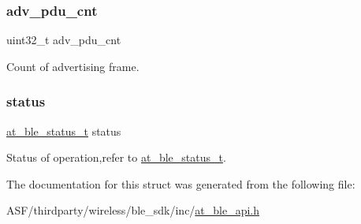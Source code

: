\subsubsection{\texorpdfstring{adv\_pdu\_cnt}{adv\_pdu\_cnt}}
{\footnotesize\ttfamily uint32\+\_\+t adv\+\_\+pdu\+\_\+cnt}



Count of advertising frame. 

\mbox{\label{structat__ble__adv__cmp__evt__t_a0b48093fc2030779fc47e5216f8019e2}} 
\subsubsection{\texorpdfstring{status}{status}}
{\footnotesize\ttfamily \mbox{\hyperlink{group__error__codes__group_ga3b1db9b95feb157b3c188ca27fe76988}{at\+\_\+ble\+\_\+status\+\_\+t}} status}



Status of operation,refer to \mbox{\hyperlink{at__ble__api_8h_ace24eb4e5ca3f325c663b809da5feb92}{at\+\_\+ble\+\_\+status\+\_\+t}}. 



The documentation for this struct was generated from the following file\+:\begin{DoxyCompactItemize}
\item 
A\+S\+F/thirdparty/wireless/ble\+\_\+sdk/inc/\mbox{\hyperlink{at__ble__api_8h}{at\+\_\+ble\+\_\+api.\+h}}\end{DoxyCompactItemize}
